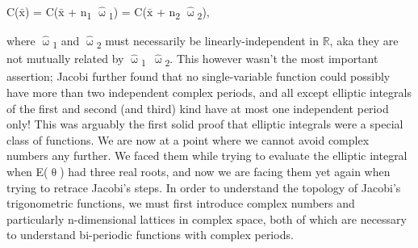 \documentclass[a4paper,10pt]{article}
\begin{document}
\begin{flushleft}
{{  \vspace{2mm}
  \begin{center}
    C($\bar{\text{x}}$) = C($\bar{\text{x}}$ + n\textsubscript{1}\,\cdot\,$\hat{\upomega}$\textsubscript{1}) = C($\bar{\text{x}}$ + n\textsubscript{2}\,\cdot\,$\hat{\upomega}$\textsubscript{2}),
  \end{center}
  \begin{flushright}
    {\vspace{-7mm}}
  \end{flushright}
  \vspace{2mm}
  where $\hat{\upomega}$\textsubscript{1} and $\hat{\upomega}$\textsubscript{2} must necessarily be linearly-independent in {$\mathbb{R}$}, aka they are not mutually related by $\hat{\upomega}$\textsubscript{1}\,{}\,\cdot\,$\hat{\upomega}$\textsubscript{2}. This however wasn't the most important assertion; Jacobi further found that no single-variable function could possibly have more than two independent complex periods, and all except elliptic integrals of the first and second (and third) kind have at most one independent period only! This was arguably the first solid proof that elliptic integrals were a special class of functions.\linebreak\linebreak\linebreak
  \textbf{\Large\pbold{}}\linebreak\linebreak
  We are now at a point where we cannot avoid complex numbers any further. We faced them while trying to evaluate the elliptic integral when {E($\uptheta$)} had three real roots, and now we are facing them yet again when trying to retrace Jacobi's steps. In order to understand the topology of Jacobi's trigonometric functions, we must first introduce complex numbers and particularly n-dimensional lattices in complex space, both of which are necessary to understand bi-periodic functions with complex periods.\linebreak\linebreak
}}
\end{flushleft}
\end{document}
